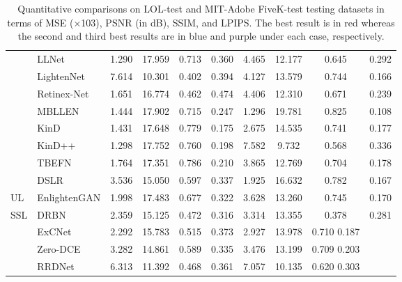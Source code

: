 \documentclass[letterpaper,12pt]{article}
\begin{document}
\begin{table}[!htbp]
{\begin{tabular}{>{\centering\arraybackslash}m{2cm}|>{\centering\arraybackslash}m{2.5cm}|c|c|c|c|c|c|c|c}
				\multirowcell{8}{SL} & LLNet & 1.290 & 17.959& 0.713 & 0.360  & 4.465 & 12.177 & 0.645 & 0.292 \\
				& LightenNet & 7.614 & 10.301& 0.402 & 0.394  & 4.127 & 13.579 & 0.744 & 0.166 \\
				& Retinex-Net& 1.651 & 16.774& 0.462 & 0.474  & 4.406 & 12.310 & 0.671 & 0.239 \\
				& MBLLEN 	 & 1.444 & 17.902& 0.715 & 0.247  &	1.296 & 19.781 & 0.825 & 0.108 \\
				& KinD 		 & 1.431 & 17.648& 0.779 & 0.175  & 2.675 & 14.535 & 0.741 & 0.177 \\
				& KinD++     & 1.298 & 17.752& 0.760 & 0.198  & 7.582 & 9.732  & 0.568 & 0.336 \\
				& TBEFN 	 & 1.764 & 17.351& 0.786 & 0.210  & 3.865 & 12.769 & 0.704 & 0.178 \\
				& DSLR 		 & 3.536 & 15.050& 0.597 & 0.337  & 1.925 & 16.632 & 0.782 & 0.167 \\
				
				\hline
				
				UL & EnlightenGAN & 1.998 & 17.483& 0.677 & 0.322  & 3.628 & 13.260 & 0.745 & 0.170 \\
				
				\hline
				
				SSL  & DRBN       & 2.359 & 15.125& 0.472 & 0.316  & 3.314 & 13.355 & 0.378 & 0.281 \\ 
				
				\hline
				
				\multirowcell{3}{ZSL} & ExCNet&2.292 & 15.783& 0.515 & 0.373  & 2.927 & 13.978 & 0.710 0.187   \\
				& Zero-DCE 	 & 3.282 & 14.861& 0.589 & 0.335  & 3.476 & 13.199 & 0.709 0.203   \\
				& RRDNet     & 6.313 & 11.392& 0.468 & 0.361  & 7.057 & 10.135 & 0.620 0.303   \\
				
				
				\hline
				
			\end{tabular}
		}
		\captionsetup{font=scriptsize} %
		\caption{\label{tab: Quantitative Comparisons on LOL-test and MIT-Adobe FiveK-test testing datasets}
			Quantitative comparisons on LOL-test and MIT-Adobe FiveK-test testing datasets in terms of MSE (×103), PSNR (in dB), SSIM, and LPIPS. The best result is in red whereas the second and third best results are in blue and purple under each case, respectively.} %
		
	\end{table}
	
\end{document}
